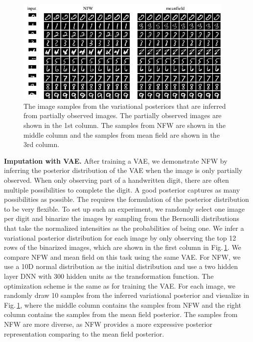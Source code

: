 \documentclass[twoside]{article}
\newcommand{\acr}[1]{\textsc{#1}\xspace}
\newcommand{\us}{\acr{NFW}}
\begin{document}
\begin{figure}[h]
\centering
\includegraphics[width=0.95\textwidth]{mnist_imputation_wn.pdf} 
\caption{The image samples from the variational posteriors that are inferred from partially observed images. The partially observed images are shown in the 1st column. The samples from \us are shown in the middle column and the samples from mean field are shown in the 3rd column. } \label{fig:mnist_imp}
\end{figure}

\textbf{Imputation with VAE.} After training a VAE, we demonstrate \us by inferring the posterior distribution of the VAE when the image is only partially observed. When only observing part of a handwritten digit, there are often multiple possibilities to complete the digit. A good posterior captures as many possibilities as possible. The requires the formulation of the posterior distribution to be very flexible. To set up such an experiment, we randomly select one image per digit and binarize the images by sampling from the Bernoulli distributions that take the normalized intensities as the probabilities of being one. We infer a variational posterior distribution for each image by only observing the top 12 rows of the binarized images, which are shown in the first column in Fig.\,\ref{fig:mnist_imp}. We compare \us and mean field on this task using the same VAE. For \us, we use a 10D normal distribution as the initial distribution and use a two hidden layer DNN with 300 hidden units as the transformation function. The optimization scheme is the same as for training the VAE. For each image, we randomly draw 10 samples from the inferred variational posterior and visualize in Fig.\,\ref{fig:mnist_imp}, where the middle column contains the samples from \us and the right column contains the samples from the mean field posterior. The samples from \us are more diverse, as \us provides a more expressive posterior representation comparing to the mean field posterior.
\end{document}

